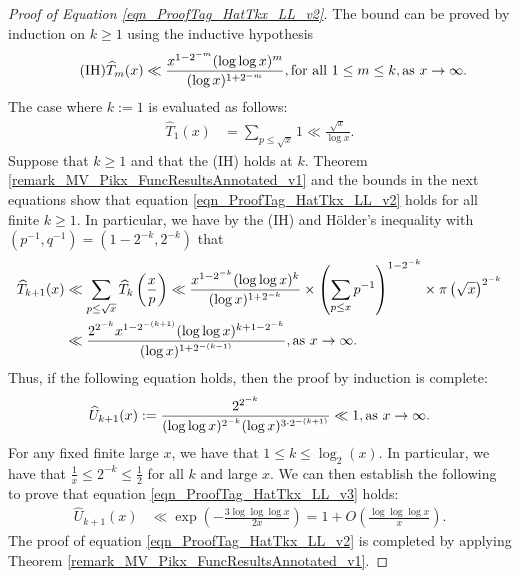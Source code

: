 \documentclass[11pt,reqno,a4letter]{article}
\newcommand{\hlocalref}[1]{\hyperref[#1]{\ref{#1}}}
\numberwithin{equation}{section}
\numberwithin{figure}{section}
\numberwithin{table}{section}
\theoremstyle{plain}
\numberwithin{theorem}{section}
\theoremstyle{definition}
\theoremstyle{remark}
\newcommand{\mathtext}[1]{\text{\rm #1}}
\begin{document}
\begin{proof}[Proof of Equation \eqref{eqn_ProofTag_HatTkx_LL_v2}]
The bound can be proved by induction on $k \geq 1$ using the inductive hypothesis
\[
\tag{IH}
\widehat{T}_m(x) \ll \frac{x^{1-2^{-m}} (\log\log x)^{m}}{(\log x)^{1+2^{-m}}}, 
	\mathtext{ for all } 1 \leq m \leq k, 
	\mathtext{ as } x \rightarrow \infty. 
\] 
The case where $k := 1$ is evaluated as follows: 
\begin{align*}
\widehat{T}_1(x) & = \sum_{p \leq \sqrt{x}} 1 \ll \frac{\sqrt{x}}{\log x}. 
\end{align*}
Suppose that $k \geq 1$ and that the (IH) holds at $k$. 
Theorem \hlocalref{remark_MV_Pikx_FuncResultsAnnotated_v1} 
and the bounds in the next equations show that 
equation \eqref{eqn_ProofTag_HatTkx_LL_v2} holds for all finite $k \geq 1$.
In particular, we have by the (IH) and 
H\"older's inequality with $\left(p^{-1}, q^{-1}\right) = \left(1-2^{-k}, 2^{-k}\right)$ that 
\begin{align*}
\widehat{T}_{k+1}(x) & \ll \sum_{p \leq \sqrt{x}} \widehat{T}_{k}\left(\frac{x}{p}\right) 
     \ll \frac{x^{1-2^{-k}} (\log\log x)^{k}}{(\log x)^{1+2^{-k}}} \times 
	\left(\sum_{p \leq x} p^{-1}\right)^{1-2^{-k}} \times 
	\pi\left(\sqrt{x}\right)^{2^{-k}} \\ 
     & \ll \frac{2^{2^{-k}} x^{1-2^{-(k+1)}} (\log\log x)^{k+1-2^{-k}}}{(\log x)^{1+2^{-(k-1)}}} ,
	\mathtext{ as } x \rightarrow \infty. 
\end{align*}
Thus, if the following equation holds, then the proof by induction is complete:
\begin{equation}
\label{eqn_ProofTag_HatTkx_LL_v3}
\widehat{U}_{k+1}(x) := \frac{2^{2^{-k}}}{(\log\log x)^{2^{-k}} (\log x)^{3 \cdot 2^{-(k+1)}}} \ll 1, 
     \mathtext{ as } x \rightarrow \infty. 
\end{equation}
For any fixed finite large $x$, we have that $1 \leq k \leq \log_2(x)$. 
In particular, we have that $\frac{1}{x} \leq 2^{-k} \leq \frac{1}{2}$ for all $k$ and large $x$. 
We can then establish the following to prove that 
equation \eqref{eqn_ProofTag_HatTkx_LL_v3} holds: 
\begin{align*}
\widehat{U}_{k+1}(x) & \ll \exp\left(-\frac{3 \log\log\log x}{2x}\right) = 
     1 + O\left(\frac{\log\log\log x}{x}\right). 
\end{align*}
The proof of equation \eqref{eqn_ProofTag_HatTkx_LL_v2} 
is completed by applying 
Theorem \hlocalref{remark_MV_Pikx_FuncResultsAnnotated_v1}. 
\end{proof}
\end{document}
